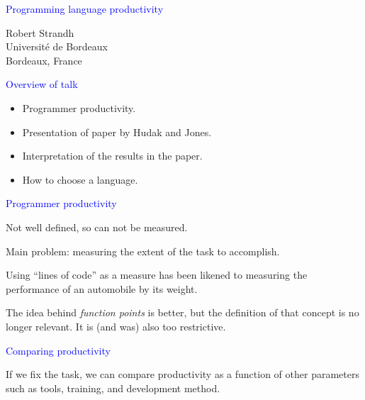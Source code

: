 \documentclass{slides}
\newcommand{\ti}[1]{\begin{center}\Large{\textcolor{blue}{#1}}\end{center}}
\begin{document}
\landscape
\setlength{\oddsidemargin}{1cm}
\setlength{\evensidemargin}{1cm}
\setlength{\marginparwidth}{1cm}
\setlength{\parskip}{0.5cm}
\setlength{\parindent}{0cm}
\begin{slide}\ti{Programming language productivity}
\vskip 0.5cm
\begin{center}
Robert Strandh \\
Université de Bordeaux \\
Bordeaux, France
\end{center}
\vfill\end{slide}
\begin{slide}\ti{Overview of talk}

  \begin{itemize}
  \item Programmer productivity.
  \item Presentation of paper by Hudak and Jones.
  \item Interpretation of the results in the paper.
  \item How to choose a language.
  \end{itemize}

\vfill\end{slide}
\begin{slide}\ti{Programmer productivity}

Not well defined, so can not be measured.

Main problem: measuring the extent of the task to accomplish.

Using ``lines of code'' as a measure has been likened to measuring the
performance of an automobile by its weight.

The idea behind \emph{function points} is better, but the definition
of that concept is no longer relevant.  It is (and was) also too
restrictive.

\vfill\end{slide}
\begin{slide}\ti{Comparing productivity}

If we fix the task, we can compare productivity as a function of other
parameters such as tools, training, and development method.

\vfill\end{slide}
\end{document}

